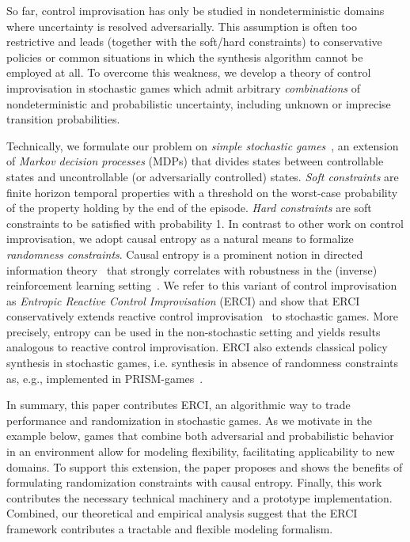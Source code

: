 So far, control improvisation has  only be studied in 
nondeterministic domains where uncertainty is resolved
adversarially. This assumption is often too restrictive and leads
(together with the soft/hard constraints) to conservative policies or
common situations in which the synthesis algorithm cannot be employed
at all. To overcome this weakness, we develop a theory of control
improvisation in stochastic games which admit
arbitrary \emph{combinations} of nondeterministic and probabilistic
uncertainty, including unknown or imprecise transition
probabilities. 

Technically, we formulate our problem on \emph{simple stochastic
games}~\cite{DBLP:conf/dimacs/Condon90}, an extension of \emph{Markov decision processes} (MDPs) that divides states
between controllable states and uncontrollable (or adversarially
controlled) states. \emph{Soft constraints} are finite horizon
temporal properties with a threshold on the worst-case probability of
the property holding by the end of the episode. \emph{Hard
constraints} are soft constraints to be satisfied with probability 1. In
contrast to other work on control improvisation, we adopt causal entropy as a natural means to formalize \emph{randomness
constraints}.  Causal entropy is a prominent notion in directed
information theory~\cite{DirectedInfoTheoery} that strongly correlates with robustness in the
(inverse) reinforcement learning setting~\cite{mceThesis,
maxEntAnswer}. We refer to this variant of control improvisation as
\emph{Entropic Reactive Control Improvisation} (ERCI) and show that ERCI
conservatively extends reactive control improvisation~\cite{DBLP:conf/cav/FremontS18} to stochastic
games. More precisely, entropy can
be used in the non-stochastic setting and yields results analogous to
reactive control improvisation. ERCI also extends  classical policy synthesis in stochastic games, i.e. synthesis in absence of randomness constraints as, e.g., implemented in PRISM-games~\cite{DBLP:journals/sttt/KwiatkowskaPW18}.


%
In summary, this paper contributes ERCI, an algorithmic way to trade
performance and randomization in stochastic games. As we motivate in
the example below, games that combine both adversarial and
probabilistic behavior in an environment allow for modeling
flexibility, facilitating applicability to new domains. To support this
extension, the paper proposes and shows the benefits of formulating
randomization constraints with causal entropy.  Finally, this work
contributes the necessary technical machinery and a prototype 
implementation. Combined, our theoretical and empirical analysis
suggest that the ERCI framework contributes a tractable and flexible
modeling formalism.

